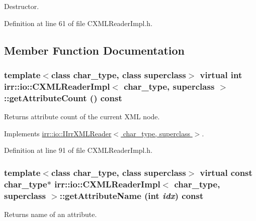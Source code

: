 Destructor. 



Definition at line 61 of file CXMLReaderImpl.h.

\subsection{Member Function Documentation}
\hypertarget{classirr_1_1io_1_1_c_x_m_l_reader_impl_0e8003aa93f362dd118c735d8a98e8d5}{
\subsubsection[{getAttributeCount}]{\setlength{\rightskip}{0pt plus 5cm}template$<$class char\_\-type, class superclass$>$ virtual int {\bf irr::io::CXMLReaderImpl}$<$ char\_\-type, {\bf superclass} $>$::getAttributeCount () const}}
\label{classirr_1_1io_1_1_c_x_m_l_reader_impl_0e8003aa93f362dd118c735d8a98e8d5}


Returns attribute count of the current XML node. 



Implements \hyperlink{classirr_1_1io_1_1_i_irr_x_m_l_reader_eaa1cfc860be7b788f78edec403cc2a2}{irr::io::IIrrXMLReader$<$ char\_\-type, superclass $>$}.

Definition at line 91 of file CXMLReaderImpl.h.\hypertarget{classirr_1_1io_1_1_c_x_m_l_reader_impl_fc1f65d70219634fc005a6048f898fb3}{
\subsubsection[{getAttributeName}]{\setlength{\rightskip}{0pt plus 5cm}template$<$class char\_\-type, class superclass$>$ virtual const char\_\-type$\ast$ {\bf irr::io::CXMLReaderImpl}$<$ char\_\-type, {\bf superclass} $>$::getAttributeName (int {\em idx}) const}}
\label{classirr_1_1io_1_1_c_x_m_l_reader_impl_fc1f65d70219634fc005a6048f898fb3}


Returns name of an attribute. 



